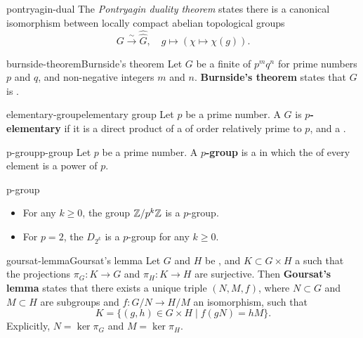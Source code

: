 \begin{example}{pontryagin-dual}
    The \textit{Pontryagin duality theorem} states there is a canonical isomorphism between locally compact abelian topological groups
    \[ G \xrightarrow{\sim} \widehat{\widehat{G}}, \quad g \mapsto (\chi \mapsto \chi(g)) . \]
\end{example}

\begin{topic}{burnside-theorem}{Burnside's theorem}
    Let $G$ be a finite  of  $p^m q^n$ for prime numbers $p$ and $q$, and non-negative integers $m$ and $n$. \textbf{Burnside's theorem} states that $G$ is .
\end{topic}

\begin{topic}{elementary-group}{elementary group}
    Let $p$ be a prime number. A  $G$ is \textbf{$p$-elementary} if it is a direct product of a  of order relatively prime to $p$, and a .
\end{topic}

\begin{topic}{p-group}{p-group}
    Let $p$ be a prime number. A \textbf{$p$-group} is a  in which the  of every element is a power of $p$.
\end{topic}

\begin{example}{p-group}
    \begin{itemize}
        \item For any $k \ge 0$, the group $\mathbb{Z}/p^k \mathbb{Z}$ is a $p$-group.
        \item For $p = 2$, the  $D_{2^k}$ is a $p$-group for any $k \ge 0$.
    \end{itemize}
\end{example}

\begin{topic}{goursat-lemma}{Goursat's lemma}
    Let $G$ and $H$ be , and $K \subset G \times H$ a  such that the projections $\pi_G \colon K \to G$ and $\pi_H \colon K \to H$ are surjective. Then \textbf{Goursat's lemma} states that there exists a unique triple $(N, M, f)$, where $N \subset G$ and $M \subset H$ are  subgroups and $f \colon G/N \to H/M$ an isomorphism, such that
    \[ K = \{ (g, h) \in G \times H \mid f(gN) = hM \} . \]
    Explicitly, $N = \ker \pi_G$ and $M = \ker \pi_H$.
\end{topic}

